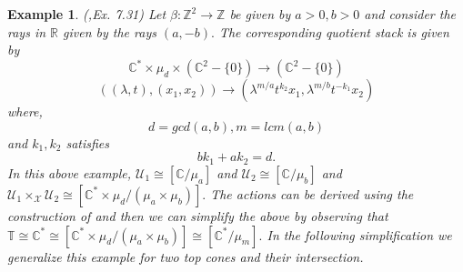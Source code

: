 \documentclass[10pt]{amsart}
\newtheorem{example}{Example}
\newcommand{\sX}{{\mathcal X}}
\numberwithin{equation}{subsection}
\begin{document}
\begin{example} (\cite{FMN},Ex. 7.31)
Let $\beta:\mathbb{Z}^2\to \mathbb{Z}$ be given  by $a>0,b>0$ and consider the rays in $\mathbb{R}$ given by the rays $(a,-b).$ The corresponding quotient stack is given by $$\mathbb{C}^*\times \mu_d\times (\mathbb{C}^2- \{0\})\to (\mathbb{C}^2-\{0\})$$
$$((\lambda,t),(x_1,x_2))\to (\lambda^{m/a}t^{k_2}x_1,\lambda^{m/b}t^{-k_1}x_2)$$ where,
$$d=gcd(a,b),m=lcm(a,b)$$ and $k_1,k_2$ satisfies
$$bk_1+ak_2=d.$$
In this above example, $\mathscr{U}_1\cong [\mathbb{C}/\mu_a]$ and $\mathscr{U}_2\cong[\mathbb{C}/\mu_b]$ and $\mathscr{U}_1\times_{\sX} \mathscr{U}_2\cong [\mathbb{C}^*\times \mu_d/(\mu_a\times \mu_b)].$ The actions can be derived using the construction of \cite{BCS} and then we can simplify the above by observing that $\mathbb{T}\cong\mathbb{C}^*\cong [\mathbb{C}^*\times \mu_d/(\mu_a\times \mu_b)]\cong[\mathbb{C}^*/\mu_m].$ In the following simplification we generalize this example for two top cones and their intersection.
\end{example}
\end{document}
